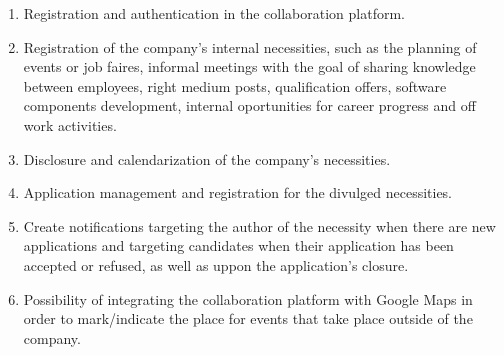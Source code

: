 \documentclass[a4paper,openright,12pt]{report}
\begin{document}
\begin{enumerate}
\item Registration and authentication in the collaboration platform.
\item Registration of the company's internal necessities, such as the planning of events or job faires, informal meetings with the goal of sharing knowledge between employees, right medium posts, qualification offers, software components development, internal oportunities for career progress and off work activities.
\item Disclosure and calendarization of the company's necessities.
\item Application management and registration for the divulged necessities.
\item Create notifications targeting the author of the necessity when there are new applications and targeting candidates when their application has been accepted or refused, as well as uppon the application's closure.
\item Possibility of integrating the collaboration platform with Google Maps in order to mark/indicate the place for events that take place outside of the company.
\end{enumerate}
\end{document}
